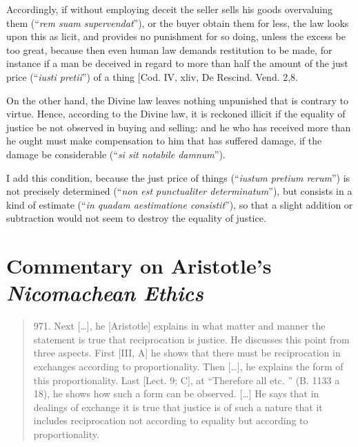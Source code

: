             Accordingly, if without employing deceit the seller sells his goods overvaluing them (``\textit{rem suam supervendat}''), or the buyer obtain them for less, the law looks upon this as licit, and provides no punishment for so doing, unless the excess be too great, because then even human law demands restitution to be made, for instance if a man be deceived in regard to more than half the amount of the just price (``\textit{iusti pretii}'') of a thing [Cod. IV, xliv, De Rescind. Vend. 2,8.

            On the other hand, the Divine law leaves nothing unpunished that is contrary to virtue. Hence, according to the Divine law, it is reckoned illicit if the equality of justice be not observed in buying and selling: and he who has received more than he ought must make compensation to him that has suffered damage, if the damage be considerable (``\textit{si sit notabile damnum}'').

            I add this condition, because the just price of things (``\textit{iustum pretium rerum}'') is not precisely determined (``\textit{non est punctualiter determinatum}''), but consists in a kind of estimate (``\textit{in quadam aestimatione consistit}''), so that a slight addition or subtraction would not seem to destroy the equality of justice.

\section{Commentary on Aristotle's \textit{Nicomachean Ethics}}

    \begin{quote}
        971. Next […], he [Aristotle] explains in what matter and manner the statement is true that reciprocation is justice. He discusses this point from three aspects. First [III, A] he shows that there must be reciprocation in exchanges according to proportionality. Then […], he explains the form of this proportionality. Last [Lect. 9; C], at “Therefore all etc. ” (B. 1133 a 18), he shows how such a form can be observed. […] He says that in dealings of exchange it is true that justice is of such a nature that it includes reciprocation not according to equality but according to proportionality.
    \end{quote}

